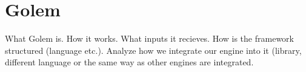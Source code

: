 \chapter{Golem}

What Golem is. 
How it works. 
What inputs it recieves.
How is the framework structured (language etc.). Analyze how we integrate our engine into it (library, different language or the same way as other engines are integrated.

